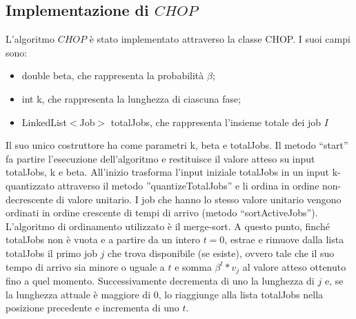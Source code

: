 \documentclass[12pt]{article}
\begin{document}
\subsection{Implementazione di $CHOP$}
L’algoritmo $CHOP$ è stato implementato attraverso la classe CHOP. I suoi campi sono:
\begin{itemize}
\item{double beta, che rappresenta la probabilità $\beta$;}
\item{int k, che rappresenta la lunghezza di ciascuna fase;}
\item{LinkedList$<$Job$>$ totalJobs, che rappresenta l’insieme totale dei job $I$}
\end{itemize}
Il suo unico costruttore ha come parametri k, beta e totalJobs. Il metodo “start” fa partire l’esecuzione dell’algoritmo e restituisce il valore atteso su input totalJobs, k e beta. All'inizio trasforma l'input iniziale totalJobs in un input k-quantizzato attraverso il metodo ''quantizeTotalJobs'' e li ordina in ordine non-decrescente di valore unitario. I job che hanno lo stesso valore unitario  vengono ordinati in ordine crescente di tempi di arrivo (metodo “sortActiveJobs”). L’algoritmo di ordinamento utilizzato è il merge-sort. A questo punto, finché totalJobs non è vuota e a partire da un intero $t = 0$, estrae e rimuove dalla lista totalJobs il primo job $j$ che trova disponibile (se esiste), ovvero tale che il suo tempo di arrivo sia minore o uguale a $t$ e somma $\beta^{t} * v_{j}$ al valore atteso ottenuto fino a quel momento. Successivamente decrementa di uno la lunghezza di $j$ e, se la lunghezza attuale è maggiore di 0, lo riaggiunge alla lista totalJobs nella posizione precedente e incrementa di uno $t$.
\end{document}
